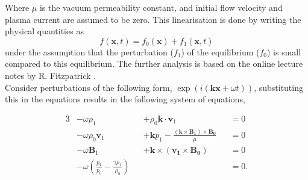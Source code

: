 \documentclass[a4paper]{article}
\begin{document}
Where $\mu$ is the vacuum permeability constant, and initial flow velocity and plasma current are assumed to be zero. This linearisation is done by writing the physical quantities as
\begin{equation*}
    f(\mathbf{x},t) = f_0(\mathbf{x}) + f_1(\mathbf{x},t)
\end{equation*}
under the assumption that the perturbation ($f_1$) of the equilibrium ($f_0$) is small compared to this equilibrium.
The further analysis is based on the online lecture notes by R. Fitzpatrick \cite{Fitzpatricknotes}.\\

Consider perturbations of the following form, $\exp(i(\mathbf{kx} + \omega t))$, substituting this in the equations results in the following system of equations,

\begin{alignat}{3}
    &-\omega\rho_1 &&+  \rho_0 \mathbf{k}\cdot\mathbf v_1 &&= 0 \label{eq:MHD_linear_wave_mass}\\
    &-\omega\rho_0\mathbf v_1 &&+  \mathbf{k} p_1 - \frac{(\mathbf{k} \times \mathbf{B_1}) \times \mathbf{B_0}}{\mu} &&= 0 \label{eq:MHD_linear_wave_moment}\\
    &-\omega\mathbf B_1&&+ \mathbf{k} \times (\mathbf{v_1} \times \mathbf{B_0}) &&= 0 \label{eq:MHD_linear_wave_charge}\\
    &-\omega(\frac{p_1}{p_0} - \frac{\gamma\rho_1}{\rho_0}) && &&= 0  \label{eq:MHD_linear_wave_enery}.
\end{alignat}
\end{document}

